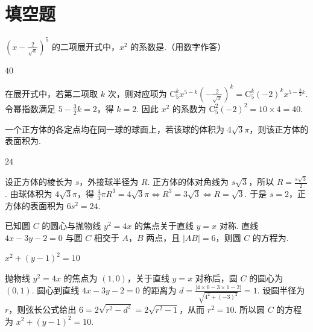 \section{填空题}

\begin{problem}
\(\left(x - \frac{2}{\sqrt{x}}\right)^5\) 的二项展开式中，\(x^2\) 的系数是\fillinblank{}.（用数字作答）
\end{problem}

\begin{answer}
\(40\)
\end{answer}

\begin{solution}
在展开式中，若第二项取 \(k\) 次，则对应项为 \(\mathrm C_5^k x^{5-k}\left(-\frac{2}{\sqrt{x}}\right)^k=\mathrm C_5^k(-2)^k x^{5-\frac32k}\). 令幂指数满足 \(5-\frac32k=2\)，得 \(k=2\). 因此 \(x^2\) 的系数为 \(\mathrm C_5^2(-2)^2=10\times4=40\).
\end{solution}

\begin{problem}
一个正方体的各定点均在同一球的球面上，若该球的体积为 \(4\sqrt{3}\pi\)，则该正方体的表面积为\fillinblank{}.
\end{problem}

\begin{answer}
\(24\)
\end{answer}

\begin{solution}
设正方体的棱长为 \(s\)，外接球半径为 \(R\). 正方体的体对角线为 \(s\sqrt{3}\)，所以
\(R=\frac{s\sqrt{3}}2\). 由球体积为 \(4\sqrt{3}\pi\)，得 \(\frac43\pi R^3=4\sqrt{3}\pi\iff R^3=3\sqrt{3}\iff R=\sqrt{3}\). 于是 \(s=2\)，正方体的表面积为 \(6s^2=24\).
\end{solution}

\begin{problem}
已知圆 \(C\) 的圆心与抛物线 \(y^{2} = 4x\) 的焦点关于直线 \(y = x\) 对称. 直线 \(4x - 3y - 2 = 0\) 与圆 \(C\) 相交于 \(A\)，\(B\) 两点，且 \(|AB| = 6\)，则圆 \(C\) 的方程为\fillinblank{}.
\end{problem}

\begin{answer}
\(x^{2} + (y - 1)^{2} = 10\)
\end{answer}

\begin{solution}
抛物线 \(y^2=4x\) 的焦点为 \((1,0)\)，关于直线 \(y=x\) 对称后，圆 \(C\) 的圆心为 \((0,1)\). 圆心到直线 \(4x-3y-2=0\) 的距离为 \(d=\frac{\lvert4\times0-3\times1-2\rvert}{\sqrt{4^2+(-3)^2}}=1\). 设圆半径为 \(r\)，则弦长公式给出 \(6=2\sqrt{r^2-d^2}=2\sqrt{r^2-1}\)，从而 \(r^2=10\). 所以圆 \(C\) 的方程为 \(x^2+(y-1)^2=10\).
\end{solution}


